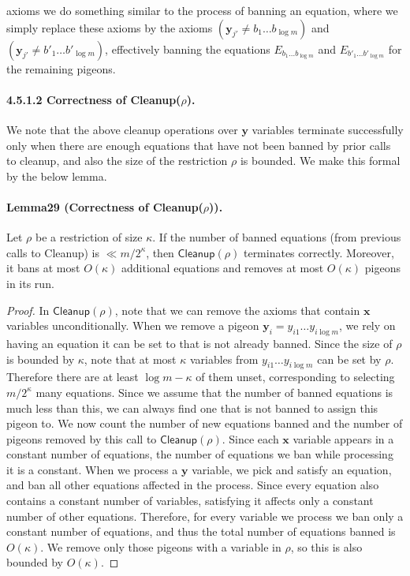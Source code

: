 axioms we do something similar to the process of banning an equation, where we simply replace these axioms by the axioms $(\mathbf y_{j'}\neq b_1\ldots b_{\log m})$ and $(\mathbf y_{j'}\neq b'_1\ldots b'_{\log m})$, effectively banning the equations $E_{b_1\ldots b_{\log m}}$ and $E_{b'_1\ldots b'_{\log m}}$ for the remaining pigeons.
\paragraph{4.5.1.2 Correctness of Cleanup($\rho$).}
We note that the above cleanup operations over $\mathbf y$ variables terminate successfully only when there are enough equations that have not been banned by prior calls to cleanup, and also the size of the restriction $\rho$ is bounded. We make this formal by the below lemma.
\paragraph{Lemma29 (Correctness of Cleanup($\rho$)).} Let $\rho$ be a restriction of size $\kappa$. If the number of banned equations (from previous calls to Cleanup) is $\ll m/2^{\kappa}$, then $\mathsf{Cleanup}(\rho)$ terminates correctly. Moreover, it bans at most $O(\kappa)$ additional equations and removes at most $O(\kappa)$ pigeons in its run.
\begin{proof}
In $\mathsf{Cleanup}(\rho)$, note that we can remove the axioms that contain $\mathbf x$ variables unconditionally. When we remove a pigeon $\mathbf y_i=y_{i1}\ldots y_{i\log m}$, we rely on having an equation it can be set to that is not already banned. Since the size of $\rho$ is bounded by $\kappa$, note that at most $\kappa$ variables from $y_{i1}\ldots y_{i\log m}$ can be set by $\rho$. Therefore there are at least $\log m-\kappa$ of them unset, corresponding to selecting $m/2^{\kappa}$ many equations. Since we assume that the number of banned equations is much less than this, we can always find one that is not banned to assign this pigeon to.
We now count the number of new equations banned and the number of pigeons removed by this call to $\mathsf{Cleanup}(\rho)$. Since each $\mathbf x$ variable appears in a constant number of equations, the number of equations we ban while processing it is a constant. When we process a $\mathbf y$ variable, we pick and satisfy an equation, and ban all other equations affected in the process. Since every equation also contains a constant number of variables, satisfying it affects only a constant number of other equations. Therefore, for every variable we process we ban only a constant number of equations, and thus the total number of equations banned is $O(\kappa)$. We remove only those pigeons with a variable in $\rho$, so this is also bounded by $O(\kappa)$.
\end{proof}
